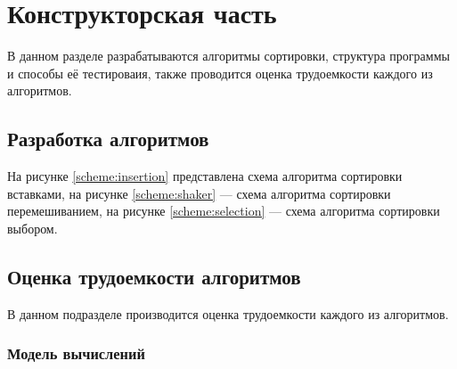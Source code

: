 \chapter{Конструкторская часть}

В данном разделе разрабатываются алгоритмы сортировки, структура программы и
способы её тестироваия, также проводится оценка трудоемкости каждого из
алгоритмов.

\section{Разработка алгоритмов}

На рисунке \ref{scheme:insertion} представлена схема алгоритма сортировки
вставками, на рисунке \ref{scheme:shaker} --- схема алгоритма сортировки
перемешиванием, на рисунке \ref{scheme:selection} --- схема алгоритма сортировки
выбором.

\noindent
{}
\noindent
{}
\noindent
{}

\clearpage
\section{Оценка трудоемкости алгоритмов}

В данном подразделе производится оценка трудоемкости каждого из алгоритмов.

\subsection{Модель вычислений}

